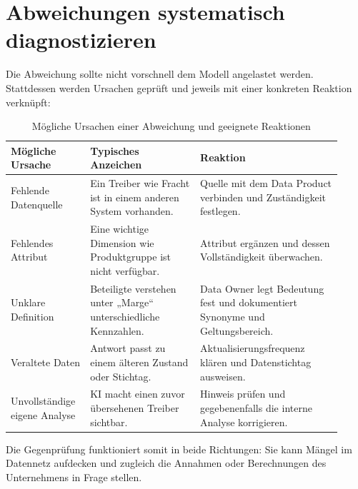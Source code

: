 \documentclass[a4paper,12pt,twoside]{report}
\theoremstyle{definition}
\begin{document}
\section{Abweichungen systematisch diagnostizieren}
Die Abweichung sollte nicht vorschnell dem Modell angelastet werden. Stattdessen werden Ursachen geprüft und jeweils mit einer konkreten Reaktion verknüpft:
\begin{table}[htbp]
\centering
\small
\caption{Mögliche Ursachen einer Abweichung und geeignete Reaktionen}
\label{tab:deviation-causes}
\begin{tabular}{p{0.21\linewidth}p{0.31\linewidth}p{0.40\linewidth}}
\toprule
\textbf{Mögliche Ursache} & \textbf{Typisches Anzeichen} & \textbf{Reaktion} \\
\midrule
Fehlende Datenquelle & Ein Treiber wie Fracht ist in einem anderen System vorhanden. & Quelle mit dem Data Product verbinden und Zuständigkeit festlegen. \\
Fehlendes Attribut & Eine wichtige Dimension wie Produktgruppe ist nicht verfügbar. & Attribut ergänzen und dessen Vollständigkeit überwachen. \\
Unklare Definition & Beteiligte verstehen unter „Marge“ unterschiedliche Kennzahlen. & Data Owner legt Bedeutung fest und dokumentiert Synonyme und Geltungsbereich. \\
Veraltete Daten & Antwort passt zu einem älteren Zustand oder Stichtag. & Aktualisierungsfrequenz klären und Datenstichtag ausweisen. \\
Unvollständige eigene Analyse & KI macht einen zuvor übersehenen Treiber sichtbar. & Hinweis prüfen und gegebenenfalls die interne Analyse korrigieren. \\
\bottomrule
\end{tabular}
\end{table}
Die Gegenprüfung funktioniert somit in beide Richtungen: Sie kann Mängel im Datennetz aufdecken und zugleich die Annahmen oder Berechnungen des Unternehmens in Frage stellen.
\end{document}
